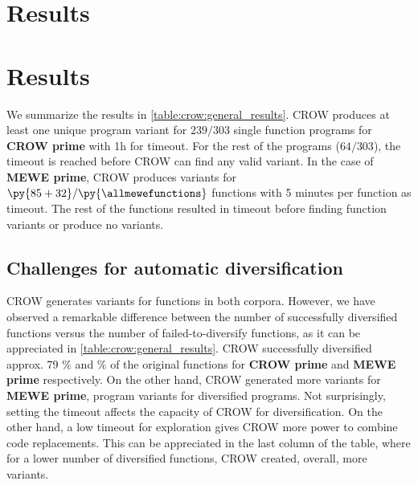 

\section{Results}

\section{Results}

We summarize the results in \autoref{table:crow:general_results}.
CROW produces at least one unique program variant for $239/303{}$ single function programs for \textbf{CROW prime} with 1h for timeout. For the rest of the programs ($64/303{}$), the timeout is reached before CROW can find any valid variant. 
In the case of \textbf{MEWE prime}, CROW produces variants for $\py{\allmewediversified}/\py{\allmewefunctions}$ functions with 5 minutes per function as timeout. The rest of the functions resulted in timeout before finding function variants or produce no variants.




\subsection{Challenges for automatic diversification}



CROW generates variants for functions in both corpora. However, we have observed a remarkable difference between the number of successfully diversified functions versus the number of failed-to-diversify functions, as it can be appreciated in \autoref{table:crow:general_results}. CROW successfully diversified approx. 79 \% and \% of the original functions for \textbf{CROW prime} and  \textbf{MEWE prime} respectively. On the other hand, CROW generated more variants for \textbf{MEWE prime}, \py{\allmewepopulation} program variants for \py{\allmewediversified} diversified programs. Not surprisingly, setting the timeout affects the capacity of CROW for diversification. On the other hand, a low timeout for exploration gives CROW more power to combine code replacements. This can be appreciated in the last column of the table, where for a lower number of diversified functions, CROW created, overall, more variants.



